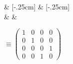 \begin{quantikz}[row sep={0.6cm,between origins}, wire types={q,q}]
	 & [-.25cm]  & [-.25cm] \\
	 &          &
\end{quantikz} $ \equiv \begin{pmatrix}
		1 & 0 & 0 & 0 \\
		0 & 1 & 0 & 0 \\
		0 & 0 & 0 & 1 \\
		0 & 0 & 1 & 0
	\end{pmatrix} $